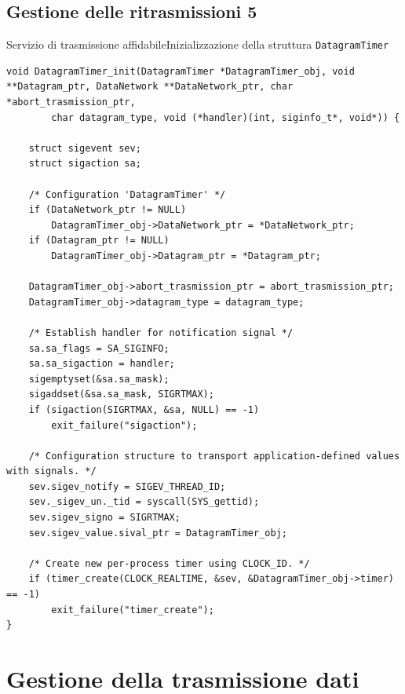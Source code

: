 \documentclass[10pt]{beamer}
\begin{document}
\subsection{Gestione delle ritrasmissioni 5}
\begin{frame}[fragile]{Servizio di trasmissione affidabile}{Inizializzazione della struttura \texttt{DatagramTimer}}

\begin{lstlisting}
void DatagramTimer_init(DatagramTimer *DatagramTimer_obj, void **Datagram_ptr, DataNetwork **DataNetwork_ptr, char *abort_trasmission_ptr,
		char datagram_type, void (*handler)(int, siginfo_t*, void*)) {

	struct sigevent sev;
	struct sigaction sa;

	/* Configuration 'DatagramTimer' */
	if (DataNetwork_ptr != NULL)
		DatagramTimer_obj->DataNetwork_ptr = *DataNetwork_ptr;
	if (Datagram_ptr != NULL)
		DatagramTimer_obj->Datagram_ptr = *Datagram_ptr;

	DatagramTimer_obj->abort_trasmission_ptr = abort_trasmission_ptr;
	DatagramTimer_obj->datagram_type = datagram_type;

	/* Establish handler for notification signal */
	sa.sa_flags = SA_SIGINFO;
	sa.sa_sigaction = handler;
	sigemptyset(&sa.sa_mask);
	sigaddset(&sa.sa_mask, SIGRTMAX);
	if (sigaction(SIGRTMAX, &sa, NULL) == -1)
		exit_failure("sigaction");

	/* Configuration structure to transport application-defined values with signals. */
	sev.sigev_notify = SIGEV_THREAD_ID;
	sev._sigev_un._tid = syscall(SYS_gettid);
	sev.sigev_signo = SIGRTMAX;
	sev.sigev_value.sival_ptr = DatagramTimer_obj;

	/* Create new per-process timer using CLOCK_ID. */
	if (timer_create(CLOCK_REALTIME, &sev, &DatagramTimer_obj->timer) == -1)
		exit_failure("timer_create");
}
\end{lstlisting}

\end{frame}


\section{Gestione della trasmissione dati}
\end{document}
